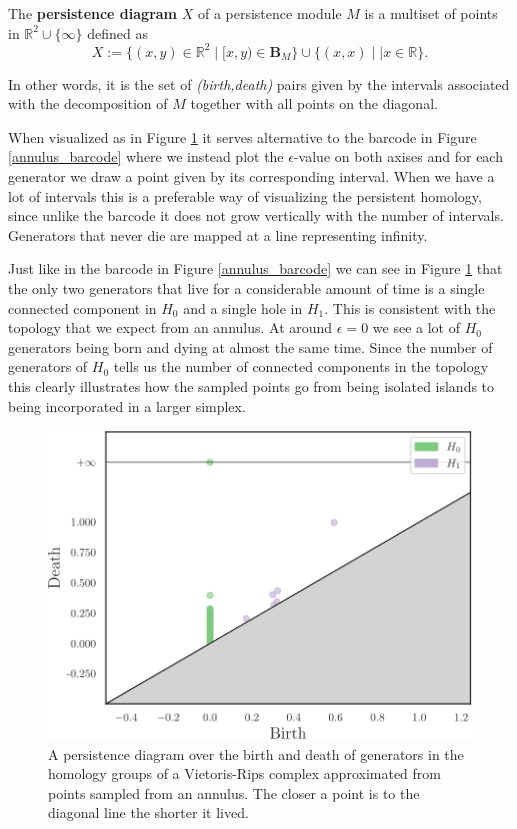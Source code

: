   \begin{definition}
    The \textbf{persistence diagram} $X$ of a persistence module $M$ is a multiset of points in $\mathbb{R}^{2}\cup \{\infty\}$ defined as
    \[
      X:=\{ (x,y) \in \mathbb{R}^{2} \mid [x,y) \in \mathbf{B}_{M}\} \cup \{ (x,x) \mid | x \in \mathbb{R}\}.
    \]
  \end{definition}
In other words, it is the set of \textit{(birth,death)} pairs given by the intervals associated with the decomposition of $M$ together with all points on the diagonal.

When visualized as in Figure \ref{pdiagram} it serves alternative to the barcode in Figure \ref{annulus_barcode} where we instead plot the $\epsilon$-value on both axises and for each generator we draw a point given by its corresponding interval. When we have a lot of intervals this is a preferable way of visualizing the persistent homology, since unlike the barcode it does not grow vertically with the number of intervals. Generators that never die are mapped at a line representing infinity.

Just like in the barcode in Figure \ref{annulus_barcode} we can see in Figure \ref{pdiagram} that the only two generators that live for a considerable amount of time is a single connected component in $H_{0}$ and a single hole in $H_{1}$. This is consistent with the topology that we expect from an annulus. At around $\epsilon=0$ we see a lot of $H_{0}$ generators being born and dying at almost the same time. Since the number of generators of $H_{0}$ tells us the number of connected components in the topology this clearly illustrates how the sampled points go from being isolated islands to being incorporated in a larger simplex.
\begin{figure}[ht]
  \centering
  \includegraphics[scale=0.7]{diagram.pdf}
  \caption{\label{pdiagram} A persistence diagram over the birth and death of generators in the homology groups of a Vietoris-Rips complex approximated from points sampled from an annulus. The closer a point is to the diagonal line the shorter it lived. }
\end{figure}

